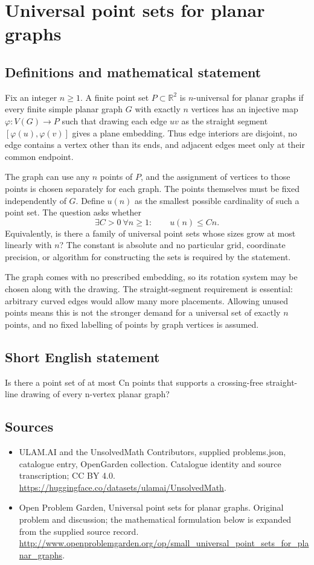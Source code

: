 \documentclass[11pt,a4paper]{article}
\begin{document}
\section*{Universal point sets for planar graphs}\label{statement}

\subsection{Definitions and mathematical statement}
Fix an integer $n\ge1$. A finite point set $P\subset\mathbb R^2$ is
$n$-universal for planar graphs if every finite simple planar graph
$G$ with exactly $n$ vertices has an injective map
$\varphi:V(G)\to P$ such that drawing each edge $uv$ as the straight
segment $[\varphi(u),\varphi(v)]$ gives a plane embedding. Thus edge
interiors are disjoint, no edge contains a vertex other than its
ends, and adjacent edges meet only at their common endpoint.

The graph can use any $n$ points of $P$, and the assignment of
vertices to those points is chosen separately for each graph.
The points themselves must be fixed independently of $G$.
Define $u(n)$ as the smallest possible cardinality of such a point
set. The question asks whether
\[
                  \exists C>0\ \forall n\ge1:\qquad u(n)\le Cn.
\]
Equivalently, is there a family of universal point sets whose sizes
grow at most linearly with $n$? The constant is absolute and no
particular grid, coordinate precision, or algorithm for constructing
the sets is required by the statement.

The graph comes with no prescribed embedding, so its rotation
system may be chosen along with the drawing. The straight-segment
requirement is essential: arbitrary curved edges would allow many
more placements. Allowing unused points means this is not the
stronger demand for a universal set of exactly $n$ points, and no
fixed labelling of points by graph vertices is assumed.
\subsection{Short English statement}
Is there a point set of at most Cn points that supports a crossing-free straight-line drawing of every n-vertex planar graph?
\subsection{Sources}
\begin{itemize}
\item[S1] ULAM.AI and the UnsolvedMath Contributors, supplied problems.json, catalogue entry, OpenGarden collection. Catalogue identity and source transcription; CC BY 4.0.
\url{https://huggingface.co/datasets/ulamai/UnsolvedMath}.
\item[S2] Open Problem Garden, Universal point sets for planar graphs. Original problem and discussion; the mathematical formulation below is expanded from the supplied source record.
\url{http://www.openproblemgarden.org/op/small_universal_point_sets_for_planar_graphs}.
\end{itemize}
\end{document}

